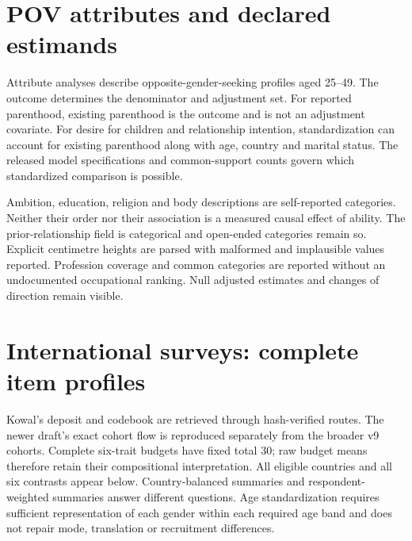 






\section{POV attributes and declared estimands}

Attribute analyses describe opposite-gender-seeking profiles aged 25--49. The outcome determines the denominator and adjustment set. For reported parenthood, existing parenthood is the outcome and is not an adjustment covariate. For desire for children and relationship intention, standardization can account for existing parenthood along with age, country and marital status. The released model specifications and common-support counts govern which standardized comparison is possible.

Ambition, education, religion and body descriptions are self-reported categories. Neither their order nor their association is a measured causal effect of ability. The prior-relationship field is categorical and open-ended categories remain so. Explicit centimetre heights are parsed with malformed and implausible values reported. Profession coverage and common categories are reported without an undocumented occupational ranking. Null adjusted estimates and changes of direction remain visible.




\section{International surveys: complete item profiles}

Kowal's deposit and codebook are retrieved through hash-verified routes. The newer draft's exact cohort flow is reproduced separately from the broader v9 cohorts. Complete six-trait budgets have fixed total 30; raw budget means therefore retain their compositional interpretation. All eligible countries and all six contrasts appear below. Country-balanced summaries and respondent-weighted summaries answer different questions. Age standardization requires sufficient representation of each gender within each required age band and does not repair mode, translation or recruitment differences.




